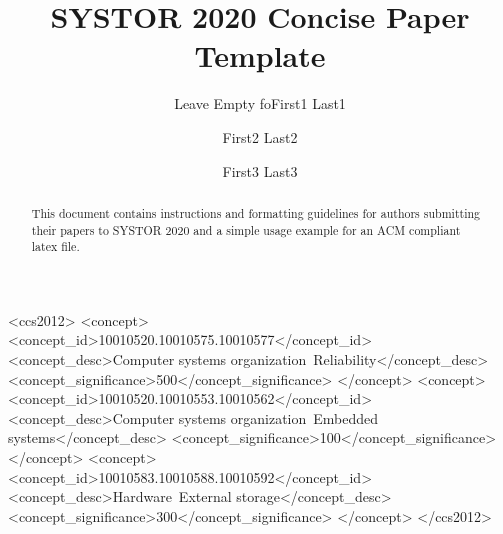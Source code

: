 \documentclass[sigconf,anonymous,10pt]{acmart}
\begin{document}
\title{SYSTOR 2020 Concise Paper Template}

\author{Leave Empty foFirst1 Last1}

\author{First2 Last2}

\author{First3 Last3}

\renewcommand{\shortauthors}{F. Last1 et al.}

\begin{abstract}
This document contains instructions and formatting guidelines
for authors submitting their papers to SYSTOR 2020 and a simple usage example for an ACM compliant latex file.
\end{abstract}


%
%
\begin{CCSXML}
<ccs2012>
<concept>
<concept_id>10010520.10010575.10010577</concept_id>
<concept_desc>Computer systems organization~Reliability</concept_desc>
<concept_significance>500</concept_significance>
</concept>
<concept>
<concept_id>10010520.10010553.10010562</concept_id>
<concept_desc>Computer systems organization~Embedded systems</concept_desc>
<concept_significance>100</concept_significance>
</concept>
<concept>
<concept_id>10010583.10010588.10010592</concept_id>
<concept_desc>Hardware~External storage</concept_desc>
<concept_significance>300</concept_significance>
</concept>
</ccs2012>
\end{CCSXML}


\end{document}
